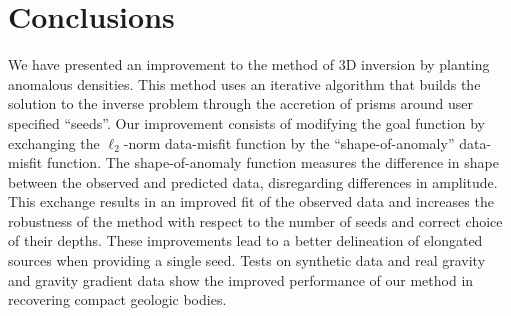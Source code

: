 \documentclass{segabs}
\begin{document}
\section{Conclusions}

\begin{sloppypar}
We have presented an improvement to the method of 3D inversion by planting
anomalous densities.
This method uses an iterative algorithm that builds the solution to the inverse
problem through the accretion of prisms around user specified ``seeds''.
Our improvement consists of modifying the goal function by exchanging the
$\ell_{2}$-norm data-misfit function by the ``shape-of-anomaly'' data-misfit
function.
The shape-of-anomaly function measures the difference in shape between the
observed and predicted data, disregarding differences in amplitude.
This exchange results in an improved fit of the observed data and increases the
robustness of the method with respect to the number of seeds and correct choice
of their depths.
These improvements lead to a better delineation of elongated sources when
providing a single seed.
Tests on synthetic data and real gravity and gravity gradient data show the
improved performance of our method in recovering compact geologic bodies. 
\end{sloppypar}
\end{document}
